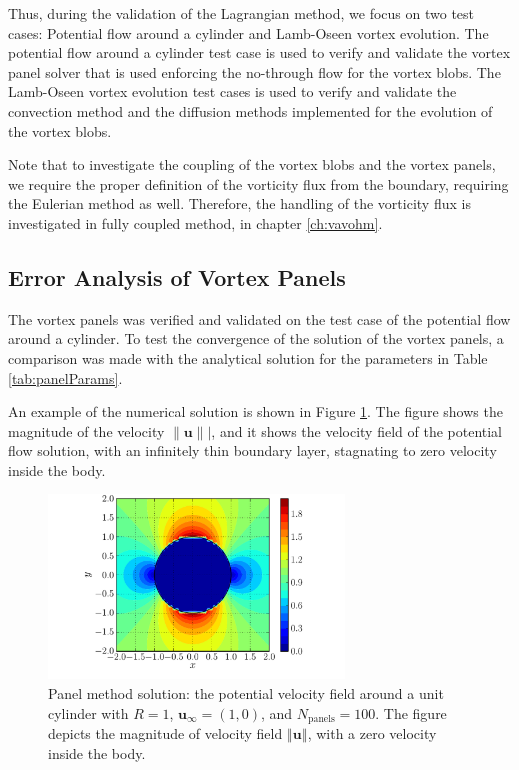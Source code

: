 Thus, during the validation of the Lagrangian method, we focus on two test cases: Potential flow around a cylinder and Lamb-Oseen vortex evolution. The potential flow around a cylinder test case is used to verify and validate the vortex panel solver that is used enforcing the no-through flow for the vortex blobs. The Lamb-Oseen vortex evolution test cases is used to verify and validate the convection method and the diffusion methods implemented for the evolution of the vortex blobs.

Note that to investigate the coupling of the vortex blobs and the vortex panels, we require the proper definition of the vorticity flux from the boundary, requiring the Eulerian method as well. Therefore, the handling of the vorticity flux is investigated in fully coupled method, in chapter \ref{ch:vavohm}.


\subsection{Error Analysis of Vortex Panels}


The vortex panels was verified and validated on the test case of the potential flow around a cylinder. To test the 
convergence of the solution of the vortex panels, a comparison was made with the analytical solution for the parameters in Table \ref{tab:panelParams}.

An example of the numerical solution is shown in Figure \ref{fig:panelCylinder_velocityField}. The figure shows the magnitude of the velocity $\lVert\mathbf{u}\rVert|$, and it shows the velocity field of the potential flow solution, with an infinitely thin boundary layer, stagnating to zero velocity inside the body.

	\begin{figure}[p]
	\centering
	\includegraphics[width=0.7\textwidth]{figures/lagrangian/panelCylinder_velocityField.pdf}
	\caption{Panel method solution: the potential velocity field around a unit cylinder with $R = 1$, $\mathbf{u}_{\infty} = (1, 0)$, and $N_{\mathrm{panels}}=100$. The figure depicts the magnitude of velocity field $\left\Vert\mathbf{u}\right\Vert$, with a zero velocity inside the body.}
	\label{fig:panelCylinder_velocityField}
	\end{figure}

